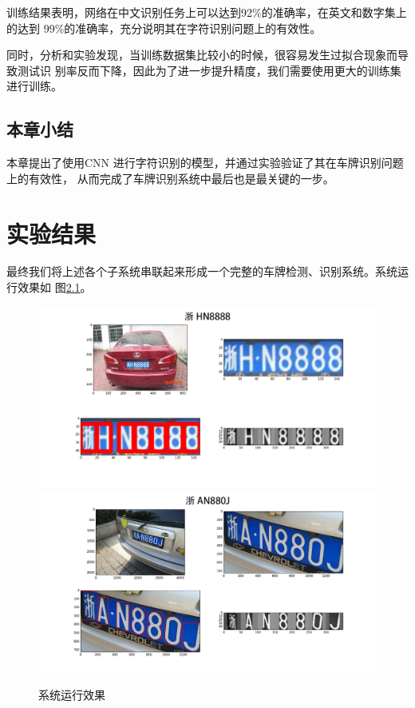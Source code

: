 训练结果表明，网络在中文识别任务上可以达到92\%的准确率，在英文和数字集上的达到
99\%的准确率，充分说明其在字符识别问题上的有效性。

同时，分析和实验发现，当训练数据集比较小的时候，很容易发生过拟合现象而导致测试识
别率反而下降，因此为了进一步提升精度，我们需要使用更大的训练集进行训练。

\section{本章小结}

本章提出了使用CNN 进行字符识别的模型，并通过实验验证了其在车牌识别问题上的有效性，
从而完成了车牌识别系统中最后也是最关键的一步。

\chapter{实验结果}

最终我们将上述各个子系统串联起来形成一个完整的车牌检测、识别系统。系统运行效果如
图\ref{Fig:End2EndDemo}。

\begin{figure}[ht]
\centering
{}
{\includegraphics[width=1.0\linewidth]{./Figure/End2EndDemo.png}}
{\includegraphics[width=1.0\linewidth]{./Figure/End2EndDemo2.png}}
\caption{系统运行效果}\label{Fig:End2EndDemo}
\end{figure}

